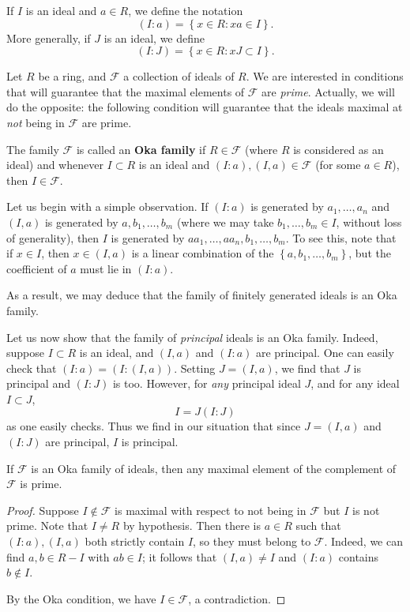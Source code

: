If $I$ is an ideal and $a \in R$, we define the notation
\[ (I:a) = \left\{ x\in R: xa \in I\right\} . \]
More generally, if $J$ is an ideal, we define
\[ (I:J) = \left\{x \in R: xJ \subset I\right\} . \]

Let $R$ be a ring, and $\mathcal{F}$ a collection of ideals of $R$. 
We are interested in conditions that will guarantee that the maximal elements
of $\mathcal{F}$ are \emph{prime}.
Actually, we will do the opposite: the following condition will guarantee that
the ideals maximal at \emph{not} being in $\mathcal{F}$ are prime. 

\begin{definition} \label{okafamily}
The family $\mathcal{F}$ is called an \textbf{Oka family} if $R \in
\mathcal{F}$ (where $R$ is considered as an ideal) and whenever $I \subset R$ is an
ideal and $(I:a), (I,a) \in \mathcal{F}$ (for some $a \in R$), then $I \in
\mathcal{F}$.
\end{definition} 

\begin{example} \label{exm:okacard}
Let us begin with a simple observation. If $(I:a)$ is generated by
$a_1, \dots, a_n$ and $(I,a)$ is generated by $a, b_1, \dots, b_m$ (where we
may take
$b_1, \dots, b_m \in I$, without loss of generality), then $I$
is generated by $aa_1, \dots, aa_n, b_1, \dots, b_m$.
To see this, note that if $x \in I$, then $x \in (I,a)$ is a linear
combination of the $\left\{a, b_1, \dots, b_m\right\}$, but the coefficient of
$a$ must
lie in $(I:a)$.

As a result, we may deduce that
the family of finitely generated ideals is an Oka family.
\end{example} 

\begin{example} 
Let us now show that the family of \emph{principal} ideals is an Oka family.
Indeed, suppose $I \subset R$ is an ideal, and $(I,a)$ and $(I:a)$ are
principal.
One can easily check that
$(I:a) = (I: (I, a))$.
Setting $J = (I,a)$, we find that $J$ is principal and $(I:J)$ is too.
However, for \emph{any} principal ideal $J$, and for any ideal $I \subset J$,
\[ I = J (I: J)  \]
as one easily checks. Thus we find in our situation that since $J=(I,a)$ and
$(I:J)$
are principal, $I$ is principal.
\end{example} 

\begin{proposition}\label{okathm} If $\mathcal{F}$ is an Oka
family of
ideals, then any maximal element of the complement of $\mathcal{F}$ is prime.
\end{proposition} 
\begin{proof} 
Suppose $I \notin \mathcal{F}$ is maximal with respect 
to not being in $\mathcal{F}$
but $I$ is  not prime. Note that $I \neq R$ by hypothesis.
Then there is $a \in R$ such that $(I:a), (I,a)$ both strictly contain $I$,
so they must belong to $\mathcal{F}$.
Indeed, we can find $a,b \in R - I$ with $ab \in I$; it follows that $(I,a)
\neq I$ and $(I:a)$ contains $b \notin I$.

By the Oka condition, we have $I \in
\mathcal{F}$, a contradiction.
\end{proof} 

